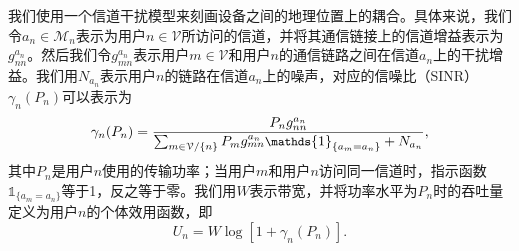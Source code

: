我们使用一个信道干扰模型来刻画设备之间的地理位置上的耦合。具体来说，我们令$a_n\in\mathcal{M}_n$表示为用户$n\in\mathcal{V}$所访问的信道，并将其通信链接上的信道增益表示为$g_{nn}^{a_n}$。然后我们令$g_{mn}^{a_n}$表示用户$m\in\mathcal{V}$和用户$n$的通信链路之间在信道$a_n$上的干扰增益。我们用$N_{a_n}$表示用户$n$的链路在信道$a_n$上的噪声，对应的信噪比（SINR）$\gamma_n(P_n)$可以表示为
\begin{equation}
\small
\gamma_n(P_n)=\frac{P_{n}g_{nn}^{a_n}}{\sum_{m\in \mathcal{V}/\{n\}}P_{m}g_{mn}^{a_n}\mathds{1}_{\{a_m=a_n\}}+N_{a_n}},
\end{equation}
其中$P_n$是用户$n$使用的传输功率；当用户$m$和用户$n$访问同一信道时，指示函数$\mathds{1}_{\{a_m = a_n\}}$等于1，反之等于零。我们用$W$表示带宽，并将功率水平为$P_n$时的吞吐量定义为用户$n$的个体效用函数，即
\vspace{-0.2cm}
\begin{equation}\label{indiu}
U_n=W\log[1+\gamma_n(P_n)].
\end{equation}

